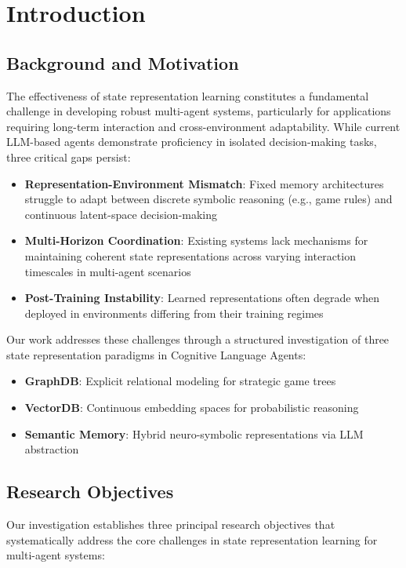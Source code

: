\section{Introduction}
\subsection{Background and Motivation}
The effectiveness of state representation learning constitutes a fundamental challenge in developing robust multi-agent systems, particularly for applications requiring long-term interaction and cross-environment adaptability. While current LLM-based agents demonstrate proficiency in isolated decision-making tasks, three critical gaps persist:

\begin{itemize}
    \item \textbf{Representation-Environment Mismatch}: Fixed memory architectures struggle to adapt between discrete symbolic reasoning (e.g., game rules) and continuous latent-space decision-making
    
    \item \textbf{Multi-Horizon Coordination}: Existing systems lack mechanisms for maintaining coherent state representations across varying interaction timescales in multi-agent scenarios
    
    \item \textbf{Post-Training Instability}: Learned representations often degrade when deployed in environments differing from their training regimes
\end{itemize}

Our work addresses these challenges through a structured investigation of three state representation paradigms in Cognitive Language Agents:

\begin{itemize}
    \item \textbf{GraphDB}: Explicit relational modeling for strategic game trees
    \item \textbf{VectorDB}: Continuous embedding spaces for probabilistic reasoning
    \item \textbf{Semantic Memory}: Hybrid neuro-symbolic representations via LLM abstraction
\end{itemize}

\subsection{Research Objectives}
Our investigation establishes three principal research objectives that systematically address the core challenges in state representation learning for multi-agent systems:

